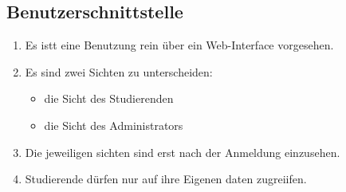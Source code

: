 \documentclass[parskip=full]{scrartcl}
\begin{document}
\subsection{Benutzerschnittstelle}
\begin{enumerate}
  \item Es istt eine Benutzung rein über ein Web-Interface vorgesehen.
  \item Es sind zwei Sichten zu unterscheiden:
        \begin{itemize}
          \item die Sicht des Studierenden
          \item die Sicht des Administrators
        \end{itemize}
  \item Die jeweiligen sichten sind erst nach der Anmeldung einzusehen. 
  \item Studierende dürfen nur auf ihre Eigenen daten zugreiifen.
  
\end{enumerate}
\end{document}
